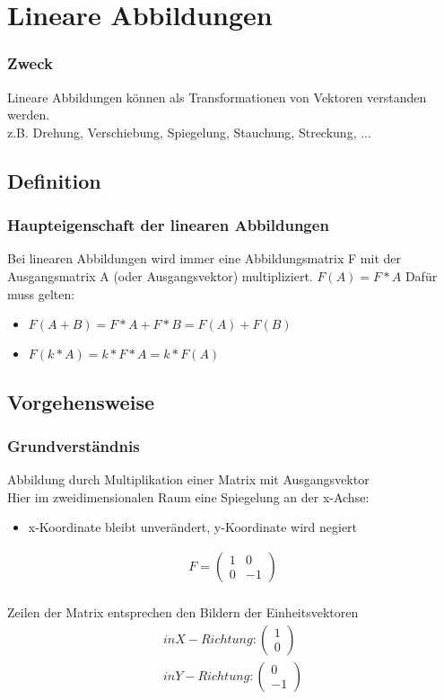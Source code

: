 \section{Lineare Abbildungen}
\begin{frame}
    \frametitle{Zweck}
    Lineare Abbildungen können als Transformationen von Vektoren verstanden werden. \\
    z.B. Drehung, Verschiebung, Spiegelung, Stauchung, Streckung, ...
\end{frame}

\subsection{Definition}

\begin{frame}
	\frametitle{Haupteigenschaft der linearen Abbildungen}
	Bei linearen Abbildungen wird immer eine Abbildungsmatrix F mit der Ausgangsmatrix A (oder Ausgangsvektor) multipliziert. $F(A)=F*A$
	\newline
	Dafür muss gelten:
	\begin{itemize}
		\item $F(A+B)= F*A+F*B = F(A)+F(B)$
		\item $F(k*A)= k*F*A = k*F(A)$
	\end{itemize}
\end{frame}

\subsection{Vorgehensweise}

\begin{frame}
	\frametitle{Grundverständnis}
	Abbildung durch Multiplikation einer Matrix mit Ausgangsvektor \\
	Hier im zweidimensionalen Raum eine Spiegelung an der x-Achse:
	\begin{itemize}
		\item x-Koordinate bleibt unverändert, y-Koordinate wird negiert
	  \end{itemize}
	  \begin{gather*}
		F = \begin{pmatrix}
			1 & 0 \\
			0 & -1
			\end{pmatrix} \\ \end{gather*}

		Zeilen der Matrix entsprechen den Bildern der Einheitsvektoren
		\begin{gather*} in X-Richtung:  \begin{pmatrix}
			1 \\
			0
			\end{pmatrix} \\
		in Y-Richtung: \begin{pmatrix}
			0 \\
			-1
			\end{pmatrix} \\ \end{gather*}
\end{frame}

